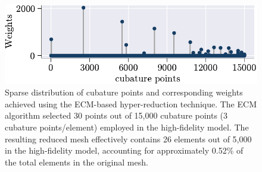 \documentclass[11pt]{article}
\begin{document}
\begin{figure}[t]
    \centering
    \includegraphics[width=0.8\linewidth]{reduced_mesh_empCM.pdf}
    \caption{Sparse distribution of cubature points and corresponding weights achieved using the ECM-based hyper-reduction technique. The ECM algorithm selected 30 points out of 15,000 cubature points (3 cubature points/element) employed in the high-fidelity model. The resulting reduced mesh effectively contains 26 elements out of 5,000 in the high-fidelity model, accounting for approximately 0.52\% of the total elements in the original mesh.}
    \label{fig:reduced_mesh_ecm}
\end{figure}
\end{document}
